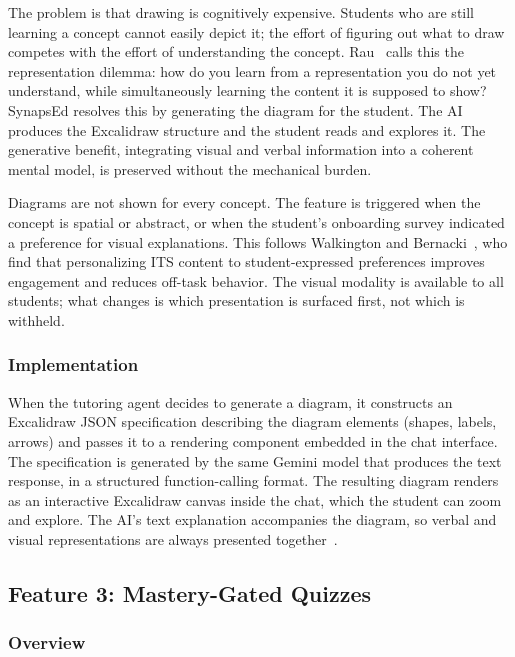 \documentclass{stylefiles/capstone}
\begin{document}
The problem is that drawing is cognitively expensive. Students who are still learning a concept cannot easily depict it; the effort of figuring out what to draw competes with the effort of understanding the concept. Rau~\cite{rau2017visual} calls this the representation dilemma: how do you learn from a representation you do not yet understand, while simultaneously learning the content it is supposed to show? SynapsEd resolves this by generating the diagram for the student. The AI produces the Excalidraw structure and the student reads and explores it. The generative benefit, integrating visual and verbal information into a coherent mental model, is preserved without the mechanical burden.

Diagrams are not shown for every concept. The feature is triggered when the concept is spatial or abstract, or when the student's onboarding survey indicated a preference for visual explanations. This follows Walkington and Bernacki~\cite{walkington2019personalizing}, who find that personalizing ITS content to student-expressed preferences improves engagement and reduces off-task behavior. The visual modality is available to all students; what changes is which presentation is surfaced first, not which is withheld.

\subsubsection{Implementation}

When the tutoring agent decides to generate a diagram, it constructs an Excalidraw JSON specification describing the diagram elements (shapes, labels, arrows) and passes it to a rendering component embedded in the chat interface. The specification is generated by the same Gemini model that produces the text response, in a structured function-calling format. The resulting diagram renders as an interactive Excalidraw canvas inside the chat, which the student can zoom and explore. The AI's text explanation accompanies the diagram, so verbal and visual representations are always presented together~\cite{rau2017visual}.

\subsection{Feature 3: Mastery-Gated Quizzes}

\subsubsection{Overview}
\end{document}
